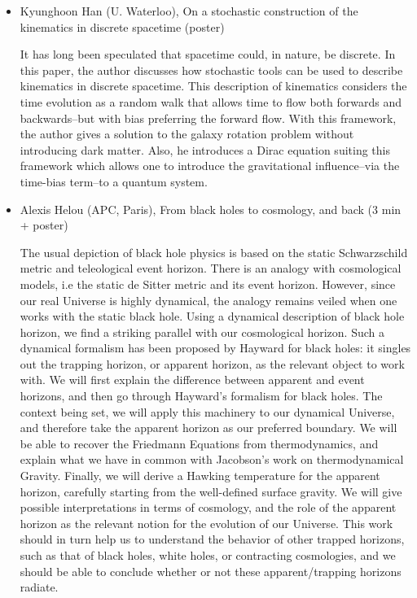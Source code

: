 \documentclass[letterpaper,12pt]{article}
\newcommand{\talk}[2]{{\fontspec{Lato Bold} #1,} {\fontspec{Lato Light Italic} #2}}
\begin{document}
\begin{itemize}
\item \talk{Kyunghoon Han (U. Waterloo)}{On a stochastic construction of the kinematics in discrete spacetime (poster)}

It has long been speculated that spacetime could, in nature, be discrete. In this paper, the author discusses how stochastic tools can be used to describe kinematics in discrete spacetime. This description of kinematics considers the time evolution as a random walk that allows time to flow both forwards and backwards--but with bias preferring the forward flow. With this framework, the author gives a solution to the galaxy rotation problem without introducing dark matter. Also, he introduces a Dirac equation suiting this framework which allows one to introduce the gravitational influence--via the time-bias term--to a quantum system.

\item \talk{Alexis Helou (APC, Paris)}{From black holes to cosmology, and back (3 min + poster)}

The usual depiction of black hole physics is based on the static Schwarzschild metric and teleological event horizon. There is an analogy with cosmological models, i.e the static de Sitter metric and its event horizon. However, since our real Universe is highly dynamical, the analogy remains veiled when one works with the static black hole. Using a dynamical description of black hole horizon, we find a striking parallel with our cosmological horizon. Such a dynamical formalism has been proposed by Hayward for black holes: it singles out the trapping horizon, or apparent horizon, as the relevant object to work with. We will first explain the difference between apparent and event horizons, and then go through Hayward’s formalism for black holes. The context being set, we will apply this machinery to our dynamical Universe, and therefore take the apparent horizon as our preferred boundary. We will be able to recover the Friedmann Equations from thermodynamics, and explain what we have in common with Jacobson’s work on thermodynamical Gravity. Finally, we will derive a Hawking temperature for the apparent horizon, carefully starting from the well-defined surface gravity. We will give possible interpretations in terms of cosmology, and the role of the apparent horizon as the relevant notion for the evolution of our Universe. This work should in turn help us to understand the behavior of other trapped horizons, such as that of black holes, white holes, or contracting cosmologies, and we should be able to conclude whether or not these apparent/trapping horizons radiate.


\end{itemize}
\end{document}
